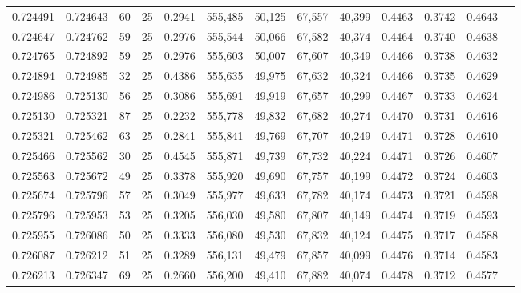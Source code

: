 \begin{tabular}{rrrrrrrrrrrrr}
0.724491 & 0.724643 &    60 &  25 &                                     0.2941 & 555,485 &  50,125 &  67,557 &  40,399 & 0.4463 & 0.3742 & 0.4643 \\
0.724647 & 0.724762 &    59 &  25 &                                     0.2976 & 555,544 &  50,066 &  67,582 &  40,374 & 0.4464 & 0.3740 & 0.4638 \\
0.724765 & 0.724892 &    59 &  25 &                                     0.2976 & 555,603 &  50,007 &  67,607 &  40,349 & 0.4466 & 0.3738 & 0.4632 \\
0.724894 & 0.724985 &    32 &  25 &                                     0.4386 & 555,635 &  49,975 &  67,632 &  40,324 & 0.4466 & 0.3735 & 0.4629 \\
0.724986 & 0.725130 &    56 &  25 &                                     0.3086 & 555,691 &  49,919 &  67,657 &  40,299 & 0.4467 & 0.3733 & 0.4624 \\
0.725130 & 0.725321 &    87 &  25 &                                     0.2232 & 555,778 &  49,832 &  67,682 &  40,274 & 0.4470 & 0.3731 & 0.4616 \\
0.725321 & 0.725462 &    63 &  25 &                                     0.2841 & 555,841 &  49,769 &  67,707 &  40,249 & 0.4471 & 0.3728 & 0.4610 \\
0.725466 & 0.725562 &    30 &  25 &                                     0.4545 & 555,871 &  49,739 &  67,732 &  40,224 & 0.4471 & 0.3726 & 0.4607 \\
0.725563 & 0.725672 &    49 &  25 &                                     0.3378 & 555,920 &  49,690 &  67,757 &  40,199 & 0.4472 & 0.3724 & 0.4603 \\
0.725674 & 0.725796 &    57 &  25 &                                     0.3049 & 555,977 &  49,633 &  67,782 &  40,174 & 0.4473 & 0.3721 & 0.4598 \\
0.725796 & 0.725953 &    53 &  25 &                                     0.3205 & 556,030 &  49,580 &  67,807 &  40,149 & 0.4474 & 0.3719 & 0.4593 \\
0.725955 & 0.726086 &    50 &  25 &                                     0.3333 & 556,080 &  49,530 &  67,832 &  40,124 & 0.4475 & 0.3717 & 0.4588 \\
0.726087 & 0.726212 &    51 &  25 &                                     0.3289 & 556,131 &  49,479 &  67,857 &  40,099 & 0.4476 & 0.3714 & 0.4583 \\
0.726213 & 0.726347 &    69 &  25 &                                     0.2660 & 556,200 &  49,410 &  67,882 &  40,074 & 0.4478 & 0.3712 & 0.4577 \\

\end{tabular}
